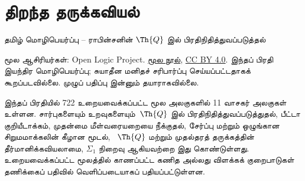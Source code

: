 \documentclass[11pt,a4paper,openany]{memoir}
\begin{document}
\raggedright
\raggedbottom
\pagestyle{plain}
\chapter*{திறந்த தருக்கவியல்}
\noindent தமிழ் மொழிபெயர்ப்பு -- ராபின்சனின் $\Th{Q}$ இல் பிரதிநிதித்துவப்படுத்தல்

\noindent மூல ஆசிரியர்கள்: Open Logic Project.
\href{https://github.com/OpenLogicProject/OpenLogic}{மூல நூல்},
\href{https://creativecommons.org/licenses/by/4.0/}{CC BY 4.0}.
இந்தப் பிரதி இயந்திர மொழிபெயர்ப்பு; சுயாதீன மனிதச் சரிபார்ப்பு செய்யப்பட்டதாகக்
கூறப்படவில்லை. முழுப் பதிப்பு இன்னும் தயாராகவில்லை.

\noindent இந்தப் பிரதியில் 722 உறையவைக்கப்பட்ட மூல அலகுகளில் 11 வாசகர்
அலகுகள் உள்ளன. சார்புகளையும் உறவுகளையும்~$\Th{Q}$ இல்
பிரதிநிதித்துவப்படுத்துதல், பீட்டா குறியீடாக்கம், முதன்மை மீள்வரையறையை
நீக்குதல், சேர்ப்பு மற்றும் ஒழுங்கான சிறுமமாக்கலின் கீழான மூடல்,
~$\Th{Q}$ மற்றும் முதல்தரத் தருக்கத்தின் தீர்மானிக்கவியலாமை,
$\Sigma_1$ நிறைவு ஆகியவற்றை இது கொண்டுள்ளது. உறையவைக்கப்பட்ட மூலத்தில்
காணப்பட்ட கணித அல்லது விளக்கக் குறைபாடுகள் தணிக்கைப் பதிவில்
வெளிப்படையாகப் பதியப்பட்டுள்ளன.

\clearpage
\tableofcontents*

\end{document}
